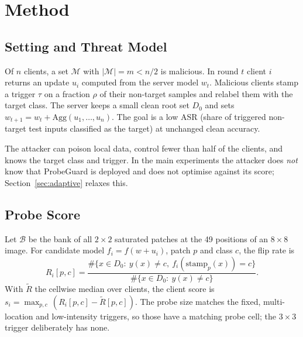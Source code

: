 \section{Method}
\subsection{Setting and Threat Model}
Of $n$ clients, a set $\mathcal M$ with $|\mathcal M|=m<n/2$ is malicious. In round $t$ client $i$ returns an update $u_i$ computed from the server model $w_t$. Malicious clients stamp a trigger $\tau$ on a fraction $\rho$ of their non-target samples and relabel them with the target class. The server keeps a small clean root set $D_0$ and sets $w_{t+1}=w_t+\mathrm{Agg}(u_1,\dots,u_n)$. The goal is a low ASR (share of triggered non-target test inputs classified as the target) at unchanged clean accuracy.

The attacker can poison local data, control fewer than half of the clients, and knows the target class and trigger. In the main experiments the attacker does \emph{not} know that ProbeGuard is deployed and does not optimise against its score; Section~\ref{sec:adaptive} relaxes this.

\subsection{Probe Score}
Let $\mathcal B$ be the bank of all $2{\times}2$ saturated patches at the 49 positions of an $8{\times}8$ image. For candidate model $f_i=f(w+u_i)$, patch $p$ and class $c$, the flip rate is
\begin{equation}
R_i[p,c]=\frac{\#\{x\in D_0:\ y(x)\neq c,\ f_i(\mathrm{stamp}_p(x))=c\}}{\#\{x\in D_0:\ y(x)\neq c\}}.
\end{equation}
With $\tilde R$ the cellwise median over clients, the client score is $s_i=\max_{p,c}\,(R_i[p,c]-\tilde R[p,c])$. The probe size matches the fixed, multi-location and low-intensity triggers, so those have a matching probe cell; the $3{\times}3$ trigger deliberately has none.

